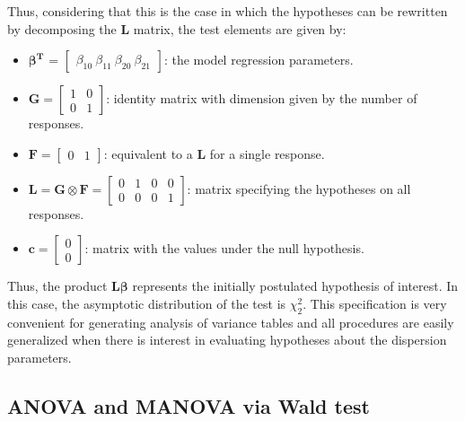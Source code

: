 \documentclass[article]{jss}\usepackage[]{graphicx}\usepackage[]{xcolor}
\begin{document}
Thus, considering that this is the case in which the hypotheses can be rewritten by decomposing the $\boldsymbol{L}$ matrix, the test elements are given by:

\begin{itemize}
  
  \item $\boldsymbol{\beta^{T}}$ = $\begin{bmatrix} \beta_{10} \  \beta_{11} \  \beta_{20} \  \beta_{21} \end{bmatrix}$: the model regression parameters.


\item $\boldsymbol{G} = \begin{bmatrix} 1 & 0 \\ 0 & 1  \end{bmatrix}$: identity matrix with dimension given by the number of responses.

\item $\boldsymbol{F} = \begin{bmatrix} 0 & 1 \end{bmatrix}$: equivalent to a $\boldsymbol{L}$ for a single response.

\item $\boldsymbol{L} = \boldsymbol{G} \otimes \boldsymbol{F} =  \begin{bmatrix} 0 & 1 & 0 & 0 \\
0 & 0 & 0 & 1 \end{bmatrix}$: matrix specifying the hypotheses on all responses.
 
\item $\boldsymbol{c} = \begin{bmatrix} 0 \\ 0 \end{bmatrix}$: matrix with the values under the null hypothesis. 

\end{itemize}

Thus, the product $\boldsymbol{L}\boldsymbol{\beta}$ represents the initially postulated hypothesis of interest. In this case, the asymptotic distribution of the test is $\chi^2_2$. This specification is very convenient for generating analysis of variance tables and all procedures are easily generalized when there is interest in evaluating hypotheses about the dispersion parameters.


\subsection{ANOVA and MANOVA via Wald test}
\end{document}
